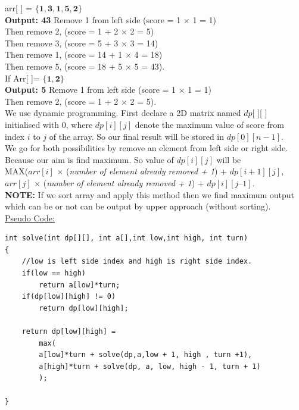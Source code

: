 \documentclass[12pt]{book}
\begin{document}
arr[ ] = $\mathbf{\{ 1, 3, 1 , 5, 2 \}}$\\
\textbf{Output: 43}
\newline
\newline
Remove 1 from left side (score = 1 $\times$ 1 = 1)\\
Then remove 2, (score = 1 + 2 $\times$ 2 = 5)\\
Then remove 3, (score = 5 + 3 $\times$ 3 = 14)\\
Then remove 1, (score = 14 + 1 $\times$ 4 = 18)\\
Then remove 5, (score = 18 + 5 $\times$ 5 = 43).\\

If Arr[ ]= $\mathbf{\{ 1, 2 \}}$\\
\textbf{Output: 5}
\newline
\newline
Remove 1 from left side (score = 1 $\times$ 1 = 1)\\
Then remove 2, (score = 1 + 2 $\times$ 2 = 5).\\

We use dynamic programming. First declare a 2D matrix named $dp$[ ][ ] initialised with 0, where $dp[i][j]$ denote the maximum value of score from index $i$ to $j$ of the array. So our final result will be stored in $dp[0][n-1]$.\\
We go for both possibilities by remove an element from left side or right side. Because our aim is find maximum. So value of $dp[i][j]$ will be\\
MAX($arr[i]$ $\times$ (\textit{number of element already removed + 1}) + $dp[i+ 1][j]$, $arr[j]$ $\times$ (\textit{number of element already removed + 1}) + $dp[i][j – 1]$.\\

\textbf{NOTE:}  If we sort array and apply this method then we find maximum output which can be or not can be output by upper approach (without sorting).\\

\underline{Pseudo Code:}\\

\begin{lstlisting}
int solve(int dp[][], int a[],int low,int high, int turn)
{
	//low is left side index and high is right side index.
	if(low == high)
		return a[low]*turn;
	if(dp[low][high] != 0)
		return dp[low][high];
	
	return dp[low][high] = 
	    max(
	    a[low]*turn + solve(dp,a,low + 1, high , turn +1), 
	    a[high]*turn + solve(dp, a, low, high - 1, turn + 1)
	    );

}
\end{lstlisting}
\end{document}
